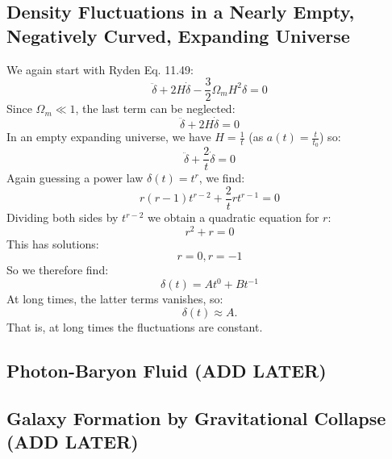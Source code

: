 \subsection{Density Fluctuations in a Nearly Empty, Negatively Curved, Expanding Universe}
We again start with Ryden Eq. 11.49:
\begin{equation}
    \ddot{\delta} + 2H\dot{\delta} - \frac{3}{2}\Omega_m H^2\delta = 0
\end{equation}
Since $\Omega_m \ll 1$, the last term can be neglected:
\begin{equation}
    \ddot{\delta} + 2H\dot{\delta} = 0
\end{equation}
In an empty expanding universe, we have $H = \frac{1}{t}$ (as $a(t) = \frac{t}{t_0}$) so:
\begin{equation}
    \ddot{\delta} + \frac{2}{t}\dot{\delta} = 0
\end{equation}
Again guessing a power law $\delta(t) = t^r$, we find:
\begin{equation}
    r(r-1)t^{r-2} + \frac{2}{t}rt^{r-1} = 0
\end{equation}
Dividing both sides by $t^{r-2}$ we obtain a quadratic equation for $r$:
\begin{equation}
    r^2 + r = 0
\end{equation}
This has solutions:
\begin{equation}
    r = 0, r = -1
\end{equation}
So we therefore find:
\begin{equation}
    \boxed{\delta(t) = At^0 + Bt^{-1}}
\end{equation}
At long times, the latter terms vanishes, so:
\begin{equation}
    \boxed{\delta(t) \approx A}.
\end{equation}
That is, at long times the fluctuations are constant.

\subsection{Photon-Baryon Fluid (ADD LATER)}
\subsection{Galaxy Formation by Gravitational Collapse (ADD LATER)}

\subsection{}

